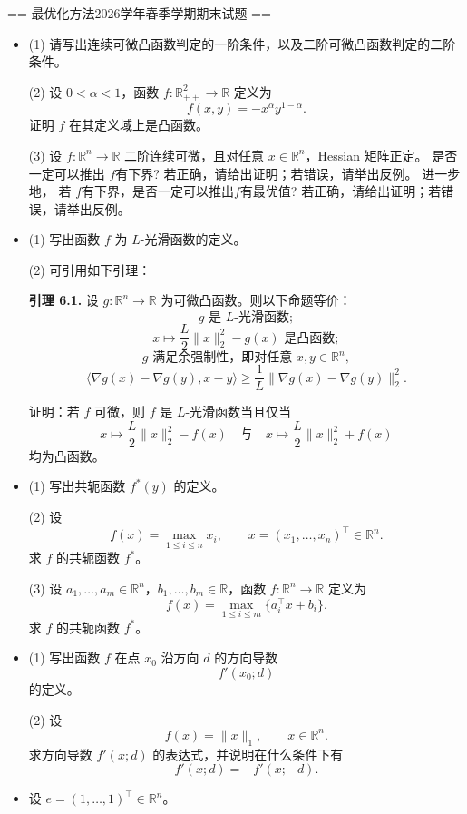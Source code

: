 == 最优化方法2026学年春季学期期末试题 ==
\begin{itemize}

\item[一、] 
(1) 请写出连续可微凸函数判定的一阶条件，以及二阶可微凸函数判定的二阶条件。

(2) 设 $0<\alpha<1$，函数 $f:\mathbb{R}_{++}^2\to\mathbb{R}$ 定义为
\[
    f(x,y)=-x^\alpha y^{1-\alpha}.
\]
证明 $f$ 在其定义域上是凸函数。

(3) 设 $f:\mathbb{R}^n\to\mathbb{R}$ 二阶连续可微，且对任意 $x\in\mathbb{R}^n$，Hessian 矩阵正定。
是否一定可以推出 $f$有下界? 若正确，请给出证明；若错误，请举出反例。
进一步地，
若 $f$有下界，是否一定可以推出$f$有最优值?
若正确，请给出证明；若错误，请举出反例。

\item[二、] 
(1) 写出函数 $f$ 为 $L$-光滑函数的定义。

(2) 可引用如下引理：

\textbf{引理 6.1.} 设 $g:\mathbb{R}^n\to\mathbb{R}$ 为可微凸函数。则以下命题等价：
\[
    g\text{ 是 }L\text{-光滑函数};
\]
\[
    x\mapsto \frac{L}{2}\|x\|_2^2-g(x)\text{ 是凸函数};
\]
\[
    g\text{ 满足余强制性，即对任意 }x,y\in\mathbb{R}^n,
\]
\[
    \langle \nabla g(x)-\nabla g(y),x-y\rangle
    \geq
    \frac{1}{L}\|\nabla g(x)-\nabla g(y)\|_2^2.
\]

证明：若 $f$ 可微，则 $f$ 是 $L$-光滑函数当且仅当
\[
    x\mapsto \frac{L}{2}\|x\|_2^2-f(x)
    \quad\text{与}\quad
    x\mapsto \frac{L}{2}\|x\|_2^2+f(x)
\]
均为凸函数。

\item[三、] 
(1) 写出共轭函数 $f^*(y)$ 的定义。

(2) 设
\[
    f(x)=\max_{1\leq i\leq n}x_i,
    \qquad x=(x_1,\dots,x_n)^\top\in\mathbb{R}^n.
\]
求 $f$ 的共轭函数 $f^*$。

(3) 设 $a_1,\dots,a_m\in\mathbb{R}^n$，$b_1,\dots,b_m\in\mathbb{R}$，函数 $f:\mathbb{R}^n\to\mathbb{R}$ 定义为
\[
    f(x)=\max_{1\leq i\leq m}\{a_i^\top x+b_i\}.
\]
求 $f$ 的共轭函数 $f^*$。

\item[四、] 
(1) 写出函数 $f$ 在点 $x_0$ 沿方向 $d$ 的方向导数
\[
    f'(x_0;d)
\]
的定义。

(2) 设
\[
    f(x)=\|x\|_1,
    \qquad x\in\mathbb{R}^n.
\]
求方向导数 $f'(x;d)$ 的表达式，并说明在什么条件下有
\[
    f'(x;d)=-f'(x;-d).
\]

\item[五、] 
设 $e=(1,\dots,1)^\top\in\mathbb{R}^n$。


\end{itemize}
